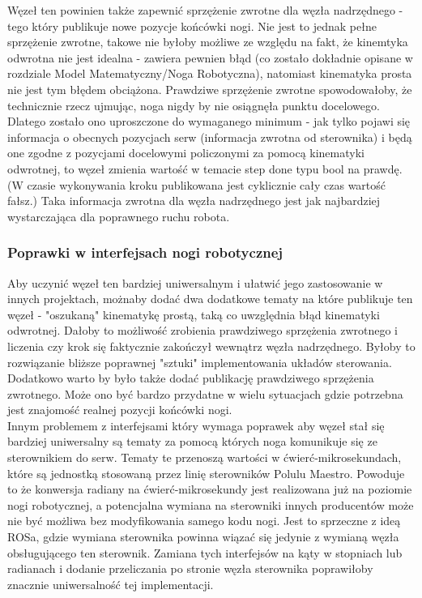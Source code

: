 \documentclass[a4paper,13pt]{article}
\begin{document}
Węzeł ten powinien także zapewnić sprzężenie zwrotne dla węzła nadrzędnego - tego który publikuje nowe pozycje końcówki nogi. Nie jest to jednak pełne sprzężenie zwrotne, takowe nie byłoby możliwe ze względu na fakt, że kinemtyka odwrotna nie jest idealna - zawiera pewnien błąd (co zostało dokładnie opisane w rozdziale Model Matematyczny/Noga Robotyczna), natomiast kinematyka prosta nie jest tym błędem obciążona. Prawdziwe sprzężenie zwrotne spowodowałoby, że technicznie rzecz ujmując, noga nigdy by nie osiągnęła punktu docelowego. Dlatego zostało ono uproszczone do wymaganego minimum - jak tylko pojawi się informacja o obecnych pozycjach serw (informacja zwrotna od sterownika) i będą one zgodne z pozycjami docelowymi policzonymi za pomocą kinematyki odwrotnej, to węzeł zmienia wartość w temacie step done typu bool na prawdę. (W czasie wykonywania kroku publikowana jest cyklicznie cały czas wartość fałsz.) Taka informacja zwrotna dla węzła nadrzędnego jest jak najbardziej wystarczająca dla poprawnego ruchu robota.\\

\subsubsection{Poprawki w interfejsach nogi robotycznej}

Aby uczynić węzeł ten bardziej uniwersalnym i ułatwić jego zastosowanie w innych projektach, możnaby dodać dwa dodatkowe tematy na które publikuje ten węzeł - "oszukaną" kinematykę prostą, taką co uwzględnia błąd kinematyki odwrotnej. Dałoby to możliwość zrobienia prawdziwego sprzężenia zwrotnego i liczenia czy krok się faktycznie zakończył wewnątrz węzła nadrzędnego. Byłoby to rozwiązanie bliższe poprawnej "sztuki" implementowania układów sterowania. Dodatkowo warto by było także dodać publikację prawdziwego sprzężenia zwrotnego. Może ono być bardzo przydatne w wielu sytuacjach gdzie potrzebna jest znajomość realnej pozycji końcówki nogi.\\

Innym problemem z interfejsami który wymaga poprawek aby węzeł stał się bardziej uniwersalny są tematy za pomocą których noga komunikuje się ze sterownikiem do serw. Tematy te przenoszą wartości w ćwierć-mikrosekundach, które są jednostką stosowaną przez linię sterowników Polulu Maestro. Powoduje to że konwersja radiany na ćwierć-mikrosekundy jest realizowana już na poziomie nogi robotycznej, a potencjalna wymiana na sterowniki innych producentów może nie być możliwa bez modyfikowania samego kodu nogi. Jest to sprzeczne z ideą ROSa, gdzie wymiana sterownika powinna wiązać się jedynie z wymianą węzła obsługującego ten sterownik. Zamiana tych interfejsów na kąty w stopniach lub radianach i dodanie przeliczania po stronie węzła sterownika poprawiłoby znacznie uniwersalność tej implementacji.\\
\end{document}
